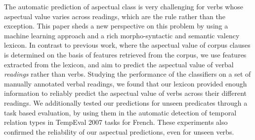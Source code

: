 The automatic prediction of aspectual class is very challenging for verbs whose aspectual value varies across readings, which are the rule rather than the exception. This paper sheds a new perspective on this problem by using a machine learning approach and a rich morpho-syntactic and semantic valency lexicon. In contrast to previous work, where the aspectual value of corpus clauses is determined on the basis of features retrieved from the corpus, we use features extracted from the lexicon, and aim to predict the aspectual value of verbal \textit{readings} rather than verbs. Studying the performance of the classifiers on a set of manually annotated verbal readings,  we found that our lexicon provided enough information to reliably predict the aspectual value of verbs across their different readings. We additionally tested our predictions for unseen predicates through a task based evaluation, by using them in the automatic detection of temporal relation types in TempEval 2007 tasks for French. These experiments also confirmed the reliability of our aspectual predictions, even for unseen verbs.
